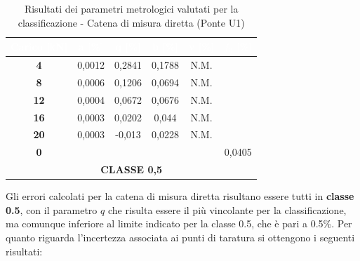 \documentclass[a4paper, twoside]{article}
\begin{document}
\begin{table}[H]
    \centering
    \renewcommand{\arraystretch}{1.3}
    \begin{tabular}{|c|c|c|c|c|c|}
        \hline
        \rowcolor{headerblue}
        \textcolor{white}{\textbf{Carico [kN]}} & \textcolor{white}{\textbf{a [\%]}} & \textcolor{white}{\textbf{q [\%]}} & \textcolor{white}{\textbf{b [\%]}} & \textcolor{white}{\textbf{v [\%]}} & \textcolor{white}{\textbf{$f_0$ [\%]}} \\
        \hline
        \rowcolor{rowlight}
        \textbf{4} & 0,0012 & 0,2841 & 0,1788 & N.M. & \\
        \hline
        \textbf{8} & 0,0006 & 0,1206 & 0,0694 & N.M. & \\
        \hline
        \rowcolor{rowlight}
        \textbf{12} & 0,0004 & 0,0672 & 0,0676 & N.M. & \\
        \hline
        \textbf{16} & 0,0003 & 0,0202 & 0,044 & N.M. & \\
        \hline
        \rowcolor{rowlight}
        \textbf{20} & 0,0003 & -0,013 & 0,0228 & N.M. & \\
        \hline
        \textbf{0} & & & & & 0,0405 \\
        \hline
        \multicolumn{6}{|c|}{\textbf{CLASSE 0,5}} \\
        \hline
    \end{tabular}
    \caption{Risultati dei parametri metrologici valutati per la classificazione - Catena di misura diretta (Ponte U1)}
    \label{tab:risultati_parametri_stbf_u1}
\end{table}

Gli errori calcolati per la catena di misura diretta risultano essere tutti in \textbf{classe 0.5}, con il parametro $q$ che risulta essere il più vincolante per la classificazione, ma comunque inferiore al limite indicato per la classe 0.5, che è pari a 0.5\%. Per quanto riguarda l'incertezza associata ai punti di taratura si ottengono i seguenti risultati:
\end{document}
